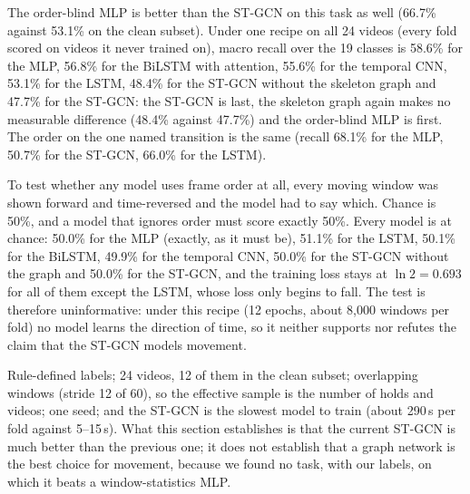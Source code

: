  The order-blind MLP is better than the ST-GCN on this task as well (66.7\% against 53.1\% on the clean subset). Under one recipe on all 24 videos (every fold scored on videos it never trained on), macro recall over the 19 classes is 58.6\% for the MLP, 56.8\% for the BiLSTM with attention, 55.6\% for the temporal CNN, 53.1\% for the LSTM, 48.4\% for the ST-GCN without the skeleton graph and 47.7\% for the ST-GCN: the ST-GCN is last, the skeleton graph again makes no measurable difference (48.4\% against 47.7\%) and the order-blind MLP is first. The order on the one named transition is the same (recall 68.1\% for the MLP, 50.7\% for the ST-GCN, 66.0\% for the LSTM).

 To test whether any model uses frame order at all, every moving window was shown forward and time-reversed and the model had to say which. Chance is 50\%, and a model that ignores order must score exactly 50\%. Every model is at chance: 50.0\% for the MLP (exactly, as it must be), 51.1\% for the LSTM, 50.1\% for the BiLSTM, 49.9\% for the temporal CNN, 50.0\% for the ST-GCN without the graph and 50.0\% for the ST-GCN, and the training loss stays at $\ln 2=0.693$ for all of them except the LSTM, whose loss only begins to fall. The test is therefore uninformative: under this recipe (12 epochs, about 8{,}000 windows per fold) no model learns the direction of time, so it neither supports nor refutes the claim that the ST-GCN models movement.

 Rule-defined labels; 24 videos, 12 of them in the clean subset; overlapping windows (stride 12 of 60), so the effective sample is the number of holds and videos; one seed; and the ST-GCN is the slowest model to train (about 290\,s per fold against 5--15\,s). What this section establishes is that the current ST-GCN is much better than the previous one; it does not establish that a graph network is the best choice for movement, because we found no task, with our labels, on which it beats a window-statistics MLP.
